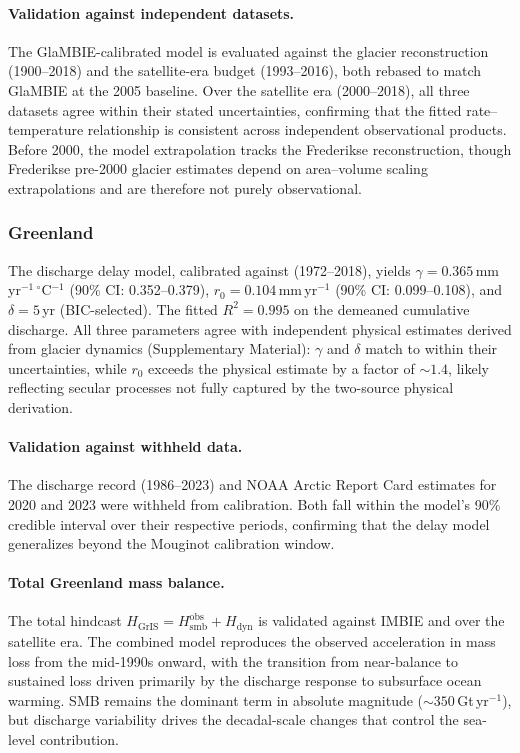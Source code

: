 \documentclass[11pt]{article}
\begin{document}
\paragraph{Validation against independent datasets.}
The GlaMBIE-calibrated model is evaluated against the \citet{Frederikse2020} glacier reconstruction (1900--2018) and the \citet{Horwath2022} satellite-era budget (1993--2016), both rebased to match GlaMBIE at the 2005 baseline.  Over the satellite era (2000--2018), all three datasets agree within their stated uncertainties, confirming that the fitted rate--temperature relationship is consistent across independent observational products. Before 2000, the model extrapolation tracks the Frederikse reconstruction, though Frederikse pre-2000 glacier estimates depend on area--volume scaling extrapolations and are therefore not purely observational.

	\subsubsection{Greenland}

The discharge delay model, calibrated against \citet{Mouginot2019} (1972--2018), yields $\gamma = 0.365$\,mm\,yr$^{-1}$\,$^\circ$C$^{-1}$ (90\% CI: 0.352--0.379), $r_0 = 0.104$\,mm\,yr$^{-1}$ (90\% CI: 0.099--0.108), and $\delta = 5$\,yr (BIC-selected). The fitted $R^2 = 0.995$ on the demeaned cumulative discharge. All three parameters agree with independent physical estimates derived from glacier dynamics (Supplementary Material): $\gamma$ and $\delta$ match to within their uncertainties, while $r_0$ exceeds the physical estimate by a factor of $\sim\!1.4$, likely reflecting secular processes not fully captured by the two-source physical derivation.

\paragraph{Validation against withheld data.}
The \citet{Mankoff2021} discharge record (1986--2023) and NOAA Arctic Report Card estimates for 2020 and 2023 \citep{Moon2024, Moon2025} were withheld from calibration. Both fall within the model's 90\% credible interval over their respective periods, confirming that the delay model generalizes beyond the Mouginot calibration window.

\paragraph{Total Greenland mass balance.}
The total hindcast $H_{\mathrm{GrIS}} = H_{\mathrm{smb}}^{\mathrm{obs}} + H_{\mathrm{dyn}}$ is validated against IMBIE \citep{Otosaka2023} and \citet{Horwath2022} over the satellite era. The combined model reproduces the observed acceleration in mass loss from the mid-1990s onward, with the transition from near-balance to sustained loss driven primarily by the discharge response to subsurface ocean warming. SMB remains the dominant term in absolute magnitude ($\sim\!350$\,Gt\,yr$^{-1}$), but discharge variability drives the decadal-scale changes that control the sea-level contribution.
\end{document}
